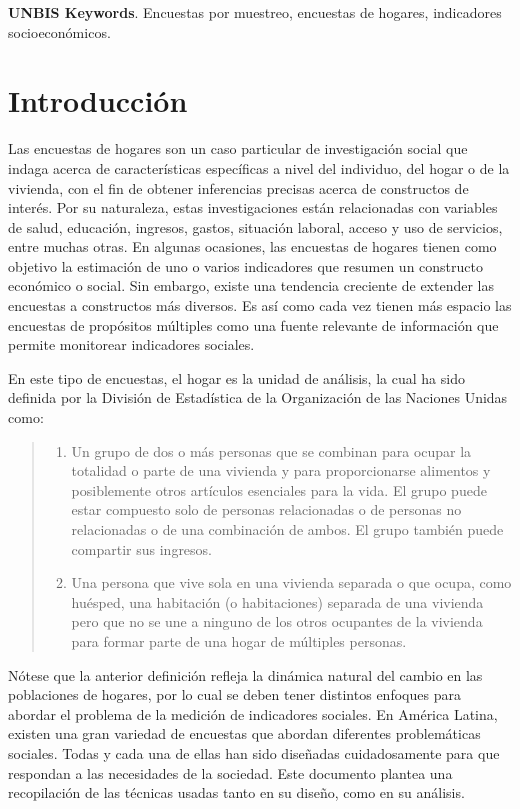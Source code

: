 \documentclass[
  10pt,
  spanish,
]{book}
\providecommand{\tightlist}{%
  \setlength{\itemsep}{0pt}\setlength{\parskip}{0pt}}
\begin{document}
\textbf{UNBIS Keywords}. Encuestas por muestreo, encuestas de hogares, indicadores socioeconómicos.

\hypertarget{introducciuxf3n}{%
\chapter{Introducción}\label{introducciuxf3n}}

Las encuestas de hogares son un caso particular de investigación social que indaga acerca de características específicas a nivel del individuo, del hogar o de la vivienda, con el fin de obtener inferencias precisas acerca de constructos de interés. Por su naturaleza, estas investigaciones están relacionadas con variables de salud, educación, ingresos, gastos, situación laboral, acceso y uso de servicios, entre muchas otras. En algunas ocasiones, las encuestas de hogares tienen como objetivo la estimación de uno o varios indicadores que resumen un constructo económico o social. Sin embargo, existe una tendencia creciente de extender las encuestas a constructos más diversos. Es así como cada vez tienen más espacio las encuestas de propósitos múltiples como una fuente relevante de información que permite monitorear indicadores sociales.

En este tipo de encuestas, el hogar es la unidad de análisis, la cual ha sido definida por la División de Estadística de la Organización de las Naciones Unidas \citep{United-Nations_2011} como:

\begin{quote}
\begin{enumerate}
\def\labelenumi{\alph{enumi}.}
\tightlist
\item
  Un grupo de dos o más personas que se combinan para ocupar la totalidad o parte de una vivienda y para proporcionarse alimentos y posiblemente otros artículos esenciales para la vida. El grupo puede estar compuesto solo de personas relacionadas o de personas no relacionadas o de una combinación de ambos. El grupo también puede compartir sus ingresos.
\item
  Una persona que vive sola en una vivienda separada o que ocupa, como huésped, una habitación (o habitaciones) separada de una vivienda pero que no se une a ninguno de los otros ocupantes de la vivienda para formar parte de una hogar de múltiples personas.
\end{enumerate}
\end{quote}

Nótese que la anterior definición refleja la dinámica natural del cambio en las poblaciones de hogares, por lo cual se deben tener distintos enfoques para abordar el problema de la medición de indicadores sociales. En América Latina, existen una gran variedad de encuestas que abordan diferentes problemáticas sociales. Todas y cada una de ellas han sido diseñadas cuidadosamente para que respondan a las necesidades de la sociedad. Este documento plantea una recopilación de las técnicas usadas tanto en su diseño, como en su análisis.
\end{document}
